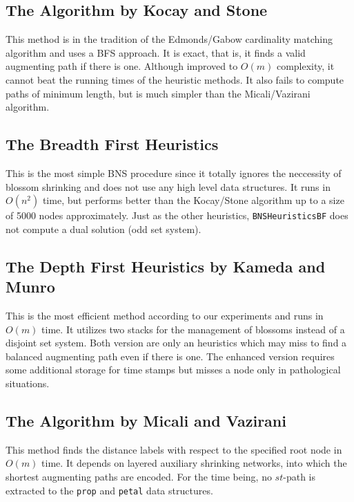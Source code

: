 \documentclass[a4paper,11pt,twoside]{book}
\begin{document}
\begin{multicols}{2}
\subsection{The Algorithm by Kocay and Stone}
This method is in the tradition of the Edmonds/Gabow cardinality matching
algorithm and uses a BFS approach. It is exact, that is, it finds a valid
augmenting path if there is one. Although improved to $O(m)$ complexity, it
cannot beat the running times of the heuristic methods. It also fails to
compute paths of minimum length, but is much simpler than the
Micali/Vazirani algorithm. 


\subsection{The Breadth First Heuristics}
This is the most simple BNS procedure since it totally ignores the neccessity
of blossom shrinking and does not use any high level data structures. It runs
in $O(n^2)$ time, but performs better than the Kocay/Stone algorithm up to a
size of 5000 nodes approximately. Just as the other heuristics,
\verb/BNSHeuristicsBF/ does not compute a dual solution (odd set system).


\subsection{The Depth First Heuristics by Kameda and Munro}
This is the most efficient method according to our experiments and runs in
$O(m)$ time. It utilizes two stacks for the management of blossoms instead of
a disjoint set system. Both version are only an heuristics which may miss to
find a balanced augmenting path even if there is one. The enhanced version
requires some additional storage for time stamps but misses a node only in
pathological situations.


\subsection{The Algorithm by Micali and Vazirani}
This method finds the distance labels with respect to the specified root node
in $O(m)$ time. It depends on layered auxiliary shrinking networks, into which
the shortest augmenting paths are encoded. For the time being, no $st$-path
is extracted to the \verb/prop/ and \verb/petal/ data structures.


\end{multicols}
\end{document}
